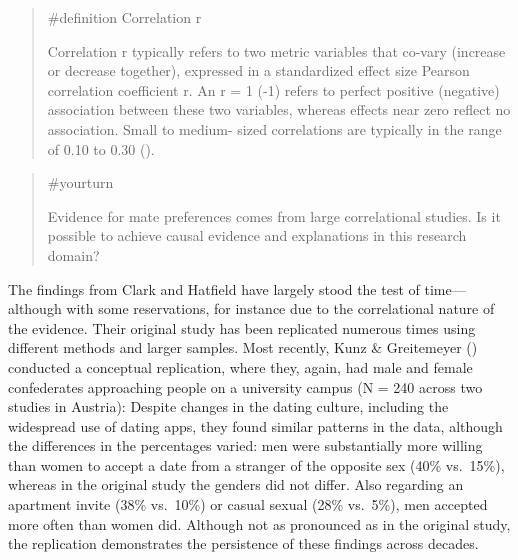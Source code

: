 \documentclass[
  letterpaper,
]{book}
\begin{document}
\begin{quote}
\label{def-correlationr}{\#definition} Correlation r

Correlation r typically refers to two metric variables that co-vary
(increase or decrease together), expressed in a standardized effect size
Pearson correlation coefficient r. An r = 1 (-1) refers to perfect
positive (negative) association between these two variables, whereas
effects near zero reflect no association. Small to medium- sized
correlations are typically in the range of 0.10 to 0.30
().
\end{quote}

\begin{quote}
{\#yourturn}

Evidence for mate preferences comes from large correlational studies. Is
it possible to achieve causal evidence and explanations in this research
domain?
\end{quote}

The findings from Clark and Hatfield have largely stood the test of
time---although with some reservations, for instance due to the
correlational nature of the evidence. Their original study has been
replicated numerous times using different methods and larger samples.
Most recently, Kunz \& Greitemeyer
() conducted a conceptual
replication, where they, again, had male and female confederates
approaching people on a university campus (N = 240 across two studies in
Austria): Despite changes in the dating culture, including the
widespread use of dating apps, they found similar patterns in the data,
although the differences in the percentages varied: men were
substantially more willing than women to accept a date from a stranger
of the opposite sex (40\% vs.~15\%), whereas in the original study the
genders did not differ. Also regarding an apartment invite (38\%
vs.~10\%) or casual sexual (28\% vs.~5\%), men accepted more often than
women did. Although not as pronounced as in the original study, the
replication demonstrates the persistence of these findings across
decades.
\end{document}
